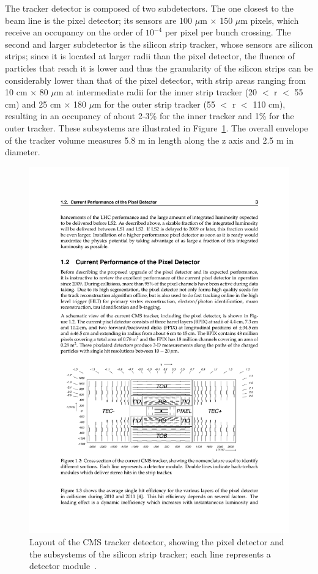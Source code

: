 The tracker detector is composed of two subdetectors. The one closest to the beam line is the pixel detector; its sensors are 100 $\mu$m $\times$ 150 $\mu$m pixels, which receive an occupancy on the order of $10^{-4}$ per pixel per bunch crossing. The second and larger subdetector is the silicon strip tracker, whose sensors are silicon strips; since it is located at larger radii than the pixel detector, the fluence of particles that reach it is lower and thus the granularity of the silicon strips can be considerably lower than that of the pixel detector, with strip areas ranging from 10 cm $\times$ 80 $\mu$m at intermediate radii for the inner strip tracker (20 $<$ r $<$ 55 cm) and 25 cm $\times$ 180 $\mu$m for the outer strip tracker (55 $<$ r $<$ 110 cm), resulting in an occupancy of about 2-3\% for the inner tracker and 1\% for the outer tracker. These subsystems are illustrated in Figure~\ref{fig:cms-trackerlayout}. The overall envelope of the tracker volume measures 5.8 m in length along the z axis and 2.5 m in diameter.

\begin{figure}[hbtp]
  \begin{center}
    \includegraphics[width=2.0\cmsFigWidth]{figures/cms-trackerlayout}
    \caption{Layout of the CMS tracker detector, showing the pixel detector and the subsystems of the silicon strip tracker; each line represents a detector module~\cite{Dominguez:1481838}.}
    \label{fig:cms-trackerlayout}
  \end{center}
\end{figure}

